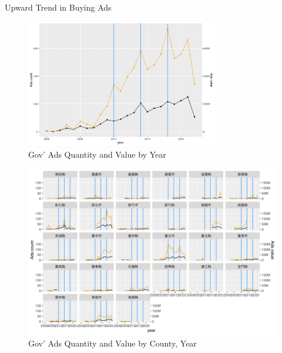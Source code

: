 \documentclass[
  10pt,
  ignorenonframetext,
  aspectratio=169,
]{beamer}
\begin{document}
\begin{frame}{Upward Trend in Buying Ads}
\protect\hypertarget{upward-trend-in-buying-ads}{}
\begin{figure}
\centering
\includegraphics[width=0.75\textwidth,height=\textheight]{./graphs/tenderSummary-1.png}
\caption{Gov' Ads Quantity and Value by Year}
\end{figure}
\end{frame}

\begin{frame}
\begin{figure}
\centering
\includegraphics{./graphs/tenderSummary-2.png}
\caption{Gov' Ads Quantity and Value by County, Year}
\end{figure}
\end{frame}
\end{document}
